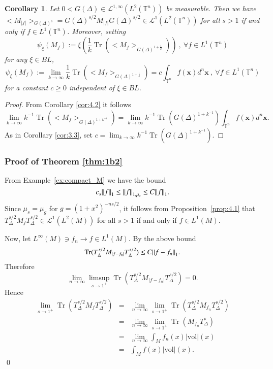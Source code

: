 \documentclass[final,1p]{elsarticle}
\numberwithin{equation}{section}
\theoremstyle{plain}
\newtheorem{cor}[thm]{Corollary}
\theoremstyle{definition}
\newcounter{prop2count}
\begin{document}
\begin{cor} \label{cor:4.3}
Let $0 < G(\Delta) \in \mathcal{L}^{1,\infty}(L^2({\ensuremath{\mathbb{T}}}^n))$ be measurable.
Then we have ${\ensuremath{\big< {M_{|f|}} \big>_{{G(\Delta)^s}}}} = G(\Delta)^{s/2} M_{|f|} G(\Delta)^{s/2} \in \mathcal{L}^{1}(L^2({\ensuremath{\mathbb{T}}}^n))$ for all $s > 1$
if and only if $f \in L^1({\ensuremath{\mathbb{T}}}^n)$.  Moreover, setting
$$
\psi_{\ensuremath{\xi}}(M_f) := {\ensuremath{\xi}} \left( \frac{1}{k} \operatorname{Tr}({\ensuremath{\big< {M_f} \big>_{{G(\Delta)^{1+\frac{1}{k}}}}}}) \right) \ , \ {\ensuremath{\forall}} f \in L^1({\ensuremath{\mathbb{T}}}^n)
$$
for any ${\ensuremath{\xi}} \in BL$,
$$
\psi_{\ensuremath{\xi}}(M_f) := \lim_{k \to \infty} \frac{1}{k}
\operatorname{Tr}({\ensuremath{\big< {M_f} \big>_{{G(\Delta)^{1+\frac{1}{k}}}}}}) = c \int_{{\ensuremath{\mathbb{T}}}^n} f(\mathbf{x}) d^n \mathbf{x} \ , \ {\ensuremath{\forall}} f \in L^1({\ensuremath{\mathbb{T}}}^n)
$$
for a constant $c \geq 0$ independent of ${\ensuremath{\xi}} \in BL$.
\end{cor}
\begin{proof}
From Corollary \ref{cor:4.2} it follows
$$
\lim_{k \to \infty} k^{-1} \operatorname{Tr}({\ensuremath{\big< {M_f} \big>_{{G(\Delta)^{1+k^{-1}}}}}}) 
= \lim_{k \to \infty} k^{-1} \operatorname{Tr}(G(\Delta)^{1+k^{-1}}) \int_{{\ensuremath{\mathbb{T}}}^n} f(\mathbf{x}) d^n \mathbf{x}.
$$
As in Corollary \ref{cor:3.3}, set
$c = \lim_{k \to \infty} k^{-1} \operatorname{Tr}(G(\Delta)^{1+k^{-1}})$.
\end{proof}

\subsubsection*{Proof of Theorem \ref{thm:1b2}}

From Example~\ref{ex:compact_M} we have the bound
$$
c_s {\mbox{\ensuremath{\| {f} \|}}}_1 \leq {\mbox{\ensuremath{\| {f} \|}}}_{1,\mu_s} \leq C {\mbox{\ensuremath{\| {f} \|}}}_1 .
$$
Since $\mu_s = \mu_g$ for $g = (1+x^2)^{-ns/2}$, it
follows from Proposition~\ref{prop:4.1} that
$T_\Delta^{s/2} M_f T_\Delta^{s/2} \in \mathcal{L}^1(L^2(M))$
for all $s > 1$ if and only if $f \in L^1(M)$.

Now, let $L^\infty(M) \ni f_n \to f \in L^1(M)$.  By the above
bound
$$
\operatorname{Tr}(T_\Delta^{s/2} M_{|f-f_n|} T_\Delta^{s/2})
\leq C {\mbox{\ensuremath{\| {f-f_n} \|}}}_1 .
$$
Therefore
$$
\lim_{n \to \infty} \limsup_{s \to 1^+}
\operatorname{Tr}(T_\Delta^{s/2} M_{|f-f_n|} T_\Delta^{s/2}) = 0 .
$$
Hence
\begin{eqnarray*}
\lim_{s \to 1^+} \operatorname{Tr}(T_\Delta^{s/2} M_{f} T_\Delta^{s/2})
& = & \lim_{n \to \infty} \lim_{s \to 1^+} \operatorname{Tr}(T_\Delta^{s/2} M_{f_n} T_\Delta^{s/2}) \\
& = & \lim_{n \to \infty} \lim_{s \to 1^+} \operatorname{Tr}(M_{f_n} T_\Delta^s) \\
& = & \lim_{n \to \infty} \int_M f_n(x) |\mathrm{vol}|(x) \\
& = & \int_M f(x) |\mathrm{vol}|(x) .
\end{eqnarray*}
\qed
\end{document}
